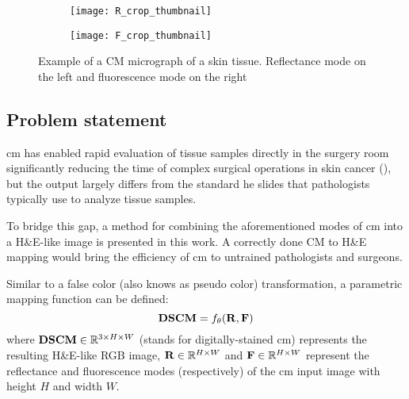 \documentclass[../main.tex]{subfiles}
\begin{document}
\begin{figure}[h]
\centering
\begin{subfigure}{.5\textwidth}
  \centering
  \texttt{[image: R\_crop\_thumbnail]}
  \label{fig:R-example}
\end{subfigure}%
\begin{subfigure}{.5\textwidth}
  \centering
  \texttt{[image: F\_crop\_thumbnail]}
  \label{fig:F-example}
\end{subfigure}
\caption{Example of a CM micrograph of a skin tissue.
Reflectance mode on the left and fluorescence mode on the right}
\label{fig:CM-example}
\end{figure}

\subsection{Problem statement}
\label{sec:problem-statement}
\gls{cm} has enabled rapid evaluation of tissue samples
directly in the surgery room significantly reducing the time of complex
surgical operations in skin cancer (\cite{Cinotti2018}),
but the output largely differs from the standard \gls{he} slides that
pathologists typically use to analyze tissue samples.

To bridge this gap, a method for combining the aforementioned modes of
\gls{cm} into a H\&E-like image is presented in this work.
A correctly done CM to H\&E mapping would bring the efficiency of \gls{cm}
to untrained pathologists and surgeons.

Similar to a false color (also knows as pseudo color) transformation,
a parametric mapping function can be defined:
\begin{equation} \label{eq:mapping-function}
	\mathbf{DSCM}
	= f_{\theta}(\mathbf{R}, \mathbf{F})
\end{equation}
where $\mathbf{DSCM} \in \mathbb{R}{}^{3 \times H \times W}$ (stands for digitally-stained
\gls{cm}) represents the resulting H\&E-like RGB image,
$\mathbf{R} \in \mathbb{R}{}^{H \times W}$ and $\mathbf{F} \in \mathbb{R}{}^{H \times W}$
represent the reflectance and fluorescence modes (respectively) of the \gls{cm} input
image with height $H$ and width $W$.
\end{document}
